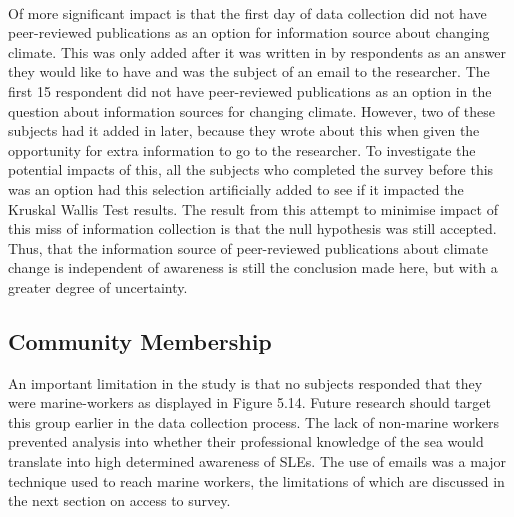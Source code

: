 \paragraph{}
Of more significant impact is that the first day of data collection did not have peer-reviewed publications as an option for information source about changing climate. This was only added after it was written in by respondents as an answer they would like to have and was the subject of an email to the researcher.  The first 15 respondent did not have peer-reviewed publications as an option in the question about information sources for changing climate. However, two of these subjects had it added in later, because they wrote about this when given the opportunity for extra information to go to the researcher. To investigate the potential impacts of this, all the subjects who completed the survey before this was an option had this selection artificially added to see if it impacted the Kruskal Wallis Test results. The result from this attempt to minimise impact of this miss of information collection is that the null hypothesis was still accepted. Thus, that the information source of peer-reviewed publications about climate change is independent of awareness is still the conclusion made here, but with a greater degree of uncertainty.
\paragraph{}


\subsection{Community Membership}
An important limitation in the study is that no subjects responded that they were marine-workers as displayed in Figure 5.14. Future research should target this group earlier in the data collection process. The lack of non-marine workers prevented analysis into whether their professional knowledge of the sea would translate into high determined awareness of SLEs. The use of emails was a major technique used to reach marine workers, the limitations of which are discussed in the next section on access to survey. 


